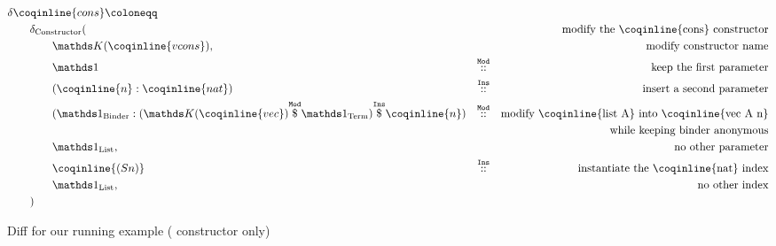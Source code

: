 \begin{figure*}[!htp]

  \noindent%
\cprotect{}%
\cprotect{}

  \vspace{2em}%

  \begin{align*}
& \delta\coqinline{cons} \coloneqq & && \\
& \qquad \delta_{\ConstructorText} (  & && \text{modify the \coqinline{cons} constructor} \\
& \qquad \qquad \MathReplace{\coqinline{vcons}}, & && \text{modify constructor name} \\
& \qquad \qquad \MathSame{} & \MathMod{}{} && \text{keep the first parameter} \\
& \qquad \qquad ( \coqinline{n} : \coqinline{nat} ) & \MathIns{}{} && \text{insert a second parameter} \\
& \qquad \qquad ( \MathSameBinder{} : \MathInsApp
  {(\MathModApp{\MathReplace{\coqinline{vec}}}{\MathSameTerm{}})}
  {\coqinline{n}}
) & \MathMod{}{}
  && \text{modify \coqinline{list A} into \coqinline{vec A n}} \\
& & && \text{while keeping binder anonymous} \\
& \qquad \qquad \MathSameList{}, & && \text{no other parameter} \\
& \qquad \qquad \coqinline{(S n)} & \MathIns{}{} && \text{instantiate the \coqinline{nat} index} \\
& \qquad \qquad \MathSameList{}, & && \text{no other index} \\
& \qquad ) && \\
  \end{align*}
  \caption{Diff for our running example ( constructor only)}\label{diff-list-vec-cons}
\end{figure*}


